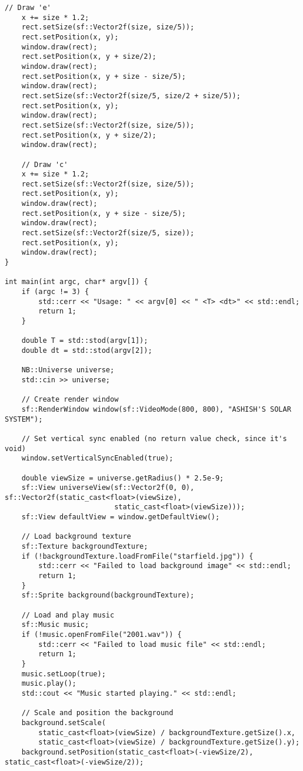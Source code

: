 \documentclass[12pt]{article}
\begin{document}
\begin{lstlisting}[style=cppcode]
    // Draw 'e'
    x += size * 1.2;
    rect.setSize(sf::Vector2f(size, size/5));
    rect.setPosition(x, y);
    window.draw(rect);
    rect.setPosition(x, y + size/2);
    window.draw(rect);
    rect.setPosition(x, y + size - size/5);
    window.draw(rect);
    rect.setSize(sf::Vector2f(size/5, size/2 + size/5));
    rect.setPosition(x, y);
    window.draw(rect);
    rect.setSize(sf::Vector2f(size, size/5));
    rect.setPosition(x, y + size/2);
    window.draw(rect);

    // Draw 'c'
    x += size * 1.2;
    rect.setSize(sf::Vector2f(size, size/5));
    rect.setPosition(x, y);
    window.draw(rect);
    rect.setPosition(x, y + size - size/5);
    window.draw(rect);
    rect.setSize(sf::Vector2f(size/5, size));
    rect.setPosition(x, y);
    window.draw(rect);
}

int main(int argc, char* argv[]) {
    if (argc != 3) {
        std::cerr << "Usage: " << argv[0] << " <T> <dt>" << std::endl;
        return 1;
    }

    double T = std::stod(argv[1]);
    double dt = std::stod(argv[2]);

    NB::Universe universe;
    std::cin >> universe;

    // Create render window
    sf::RenderWindow window(sf::VideoMode(800, 800), "ASHISH'S SOLAR SYSTEM");

    // Set vertical sync enabled (no return value check, since it's void)
    window.setVerticalSyncEnabled(true);

    double viewSize = universe.getRadius() * 2.5e-9;
    sf::View universeView(sf::Vector2f(0, 0), sf::Vector2f(static_cast<float>(viewSize),
                          static_cast<float>(viewSize)));
    sf::View defaultView = window.getDefaultView();

    // Load background texture
    sf::Texture backgroundTexture;
    if (!backgroundTexture.loadFromFile("starfield.jpg")) {
        std::cerr << "Failed to load background image" << std::endl;
        return 1;
    }
    sf::Sprite background(backgroundTexture);

    // Load and play music
    sf::Music music;
    if (!music.openFromFile("2001.wav")) {
        std::cerr << "Failed to load music file" << std::endl;
        return 1;
    }
    music.setLoop(true);
    music.play();
    std::cout << "Music started playing." << std::endl;

    // Scale and position the background
    background.setScale(
        static_cast<float>(viewSize) / backgroundTexture.getSize().x,
        static_cast<float>(viewSize) / backgroundTexture.getSize().y);
    background.setPosition(static_cast<float>(-viewSize/2), static_cast<float>(-viewSize/2));


\end{lstlisting}
\end{document}
